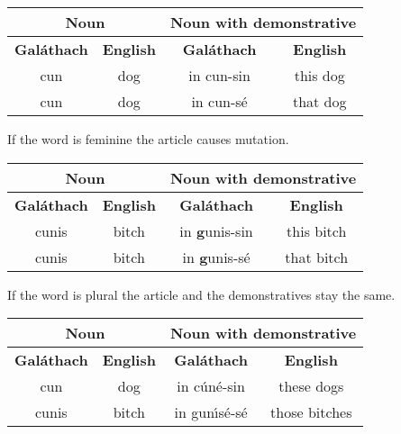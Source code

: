 \begin{table}[H]
\centering
\begin{tabular}{cccc}
  \toprule
  \multicolumn{2}{c}{\textbf{Noun}} & \multicolumn{2}{c}{\textbf{Noun with demonstrative}}\\
  \midrule
  \textbf{Gal\'{a}thach} & \textbf{English} & \textbf{Gal\'{a}thach} & \textbf{English}\\
  \cmidrule(lr){1-1}\cmidrule(lr){2-2}\cmidrule(lr){3-3}\cmidrule(lr){4-4}
  cun & dog & in cun-sin & this dog\\
  cun & dog & in cun-s\'{e} & that dog\\
  \bottomrule
\end{tabular}
\label{examples_demonstrative}
\end{table}

If the word is feminine the article causes mutation.
\begin{table}[H]
\centering
\begin{tabular}{cccc}
  \toprule
  \multicolumn{2}{c}{\textbf{Noun}} & \multicolumn{2}{c}{\textbf{Noun with demonstrative}}\\
  \midrule
  \textbf{Gal\'{a}thach} & \textbf{English} & \textbf{Gal\'{a}thach} & \textbf{English}\\
  \cmidrule(lr){1-1}\cmidrule(lr){2-2}\cmidrule(lr){3-3}\cmidrule(lr){4-4}
  cunis & bitch & in \textbf{g}unis-sin & this bitch\\
  cunis & bitch & in \textbf{g}unis-s\'{e} & that bitch\\
  \bottomrule
\end{tabular}
\label{examples_demonstrative_mutation}
\end{table}

If the word is plural the article and the demonstratives stay the same.
\begin{table}[H]
\centering
\begin{tabular}{cccc}
  \toprule
  \multicolumn{2}{c}{\textbf{Noun}} & \multicolumn{2}{c}{\textbf{Noun with demonstrative}}\\
  \midrule
  \textbf{Gal\'{a}thach} & \textbf{English} & \textbf{Gal\'{a}thach} & \textbf{English}\\
  \cmidrule(lr){1-1}\cmidrule(lr){2-2}\cmidrule(lr){3-3}\cmidrule(lr){4-4}
  cun & dog & in c\'{u}n\'{e}-sin & these dogs\\
  cunis & bitch & in gun\'{\i}s\'{e}-s\'{e} & those bitches\\
  \bottomrule
\end{tabular}
\label{examples_demonstrative_plural}
\end{table}

